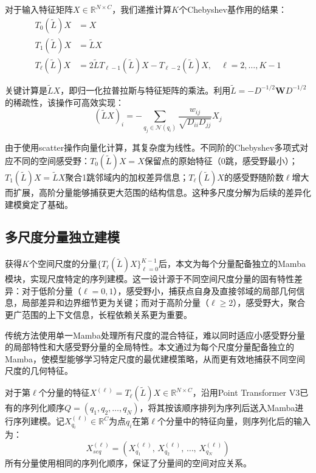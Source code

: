 对于输入特征矩阵$X \in \mathbb{R}^{N \times C}$，我们递推计算$K$个Chebyshev基作用的结果：
\begin{equation}
\begin{aligned}
T_0(\tilde{L})X &= X \\
T_1(\tilde{L})X &= \tilde{L}X \\
T_\ell(\tilde{L})X &= 2\tilde{L}T_{\ell-1}(\tilde{L})X - T_{\ell-2}(\tilde{L})X, \quad \ell = 2, \ldots, K-1
\end{aligned}
\end{equation}

关键计算是$\tilde{L}X$，即归一化拉普拉斯与特征矩阵的乘法。利用$\tilde{L} = -D^{-1/2}\mathbf{W}D^{-1/2}$的稀疏性，该操作可高效实现：
\begin{equation}
(\tilde{L}X)_i = -\sum_{q_j \in \mathcal{N}(q_i)} \frac{w_{ij}}{\sqrt{D_{ii}D_{jj}}} X_j
\end{equation}

由于使用scatter操作向量化计算，其复杂度为线性。不同阶的Chebyshev多项式对应不同的空间感受野：$T_0(\tilde{L})X = X$保留点的原始特征（0跳，感受野最小）；$T_1(\tilde{L})X = \tilde{L}X$聚合1跳邻域内的加权差异信息；$T_\ell(\tilde{L})X$的感受野随阶数$\ell$增大而扩展，高阶分量能够捕获更大范围的结构信息。这种多尺度分解为后续的差异化建模奠定了基础。

\subsection{多尺度分量独立建模}

获得$K$个空间尺度的分量$\{T_\ell(\tilde{L})X\}_{\ell=0}^{K-1}$后，本文为每个分量配备独立的Mamba模块，实现尺度特定的序列建模。这一设计源于不同空间尺度分量的固有特性差异：对于低阶分量（$\ell=0,1$），感受野小，捕获点自身及直接邻域的局部几何信息，局部差异和边界细节更为关键；而对于高阶分量（$\ell \geq 2$），感受野大，聚合更广范围的上下文信息，长程依赖关系更为重要。

传统方法使用单一Mamba处理所有尺度的混合特征，难以同时适应小感受野分量的局部特性和大感受野分量的全局特性。本文通过为每个尺度分量配备独立的Mamba，使模型能够学习特定尺度的最优建模策略，从而更有效地捕获不同空间尺度的几何特征。

对于第$\ell$个分量的特征$X^{(\ell)} = T_\ell(\tilde{L})X \in \mathbb{R}^{N \times C}$，沿用Point Transformer V3已有的序列化顺序$Q = (q_1, q_2, \ldots, q_N)$，将其按该顺序排列为序列后送入Mamba进行序列建模。记$X^{(\ell)}_{q_i} \in \mathbb{R}^{C}$为点$q_i$在第$\ell$个分量中的特征向量，则序列化后的输入为：
\begin{equation}
X^{(\ell)}_{seq} = \left(X^{(\ell)}_{q_1},\, X^{(\ell)}_{q_2},\, \ldots,\, X^{(\ell)}_{q_N}\right)
\end{equation}
所有分量使用相同的序列化顺序，保证了分量间的空间对应关系。

